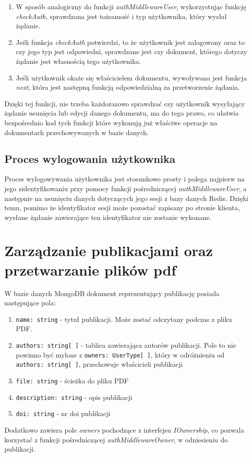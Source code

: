 \documentclass[a4paper,12pt,twoside,openany]{report}
\begin{document}
\begin{enumerate}
	
	\item W sposób analogiczny do funkcji \textit{authMiddlewareUser}, wykorzystując funkcję \textit{checkAuth}, sprawdzana jest tożsamość i typ użytkownika, który wysłał żądanie.
	
	\item Jeśli funkcja \textit{checkAuth} potwierdzi, to że użytkownik jest zalogowany oraz to czy jego typ jest odpowiedni, sprawdzane jest czy dokument, którego dotyczy żądanie jest własnością tego użytkownika. 
	
	\item Jeśli użytkownik okaże się właścicielem dokumentu, wywoływana jest funkcja \textit{next}, która jest następną funkcją odpowiedzialną za przetworzenie żądania.
\end{enumerate}

Dzięki tej funkcji, nie trzeba każdorazowo sprawdzać czy użytkownik wysyłający żądanie usunięcia lub edycji danego dokumentu, ma do tego prawo, co ułatwia bezpośrednio kod tych funkcji które wykonują już właściwe operacje na dokumentach przechowywanych w bazie danych.

\subsection{Proces wylogowania użytkownika}
Proces wylogowywania użytkownika jest stosunkowo prosty i polega najpierw na jego zidentyfikowaniu przy pomocy funkcji pośredniczącej \textit{authMiddlewareUser}, a następnie na usunięciu danych dotyczących jego sesji z bazy danych Redis. Dzięki temu, pomimo że identyfikator sesji może pozostać zapisany po stronie klienta, wysłane żądanie zawierające ten identyfikator nie zostanie wykonane.
\newpage
\section{Zarządzanie publikacjami oraz przetwarzanie plików pdf}
W bazie danych MongoDB dokument reprezentujący publikację posiada następujące pola: 
\begin{enumerate}
	
	\item \verb|name: string| - tytuł publikacji. Może zostać odczytany podczas  z pliku PDF.
	
	\item \verb|authors: string[ ]| - tablica zawierająca autorów publikacji. Pole to nie powinno być mylone z \verb|owners: UserType[ ]|, który w odróżnieniu od \verb|authors: string[ ]|, przechowuje właścicieli publikacji
	
	\item \verb|file: string| - ścieżka do pliku PDF 
	
	\item \verb|description: string| - opis publikacji
	
	\item \verb|doi: string| - nr doi publikacji
\end{enumerate}
Dodatkowo zawiera pole \textit{owners} pochodzące z interfejsu \textit{IOwnership}, co pozwala korzystać z funkcji pośredniczącej \textit{authMiddlewareOwner}, w odniesieniu do publikacji.
\end{document}
